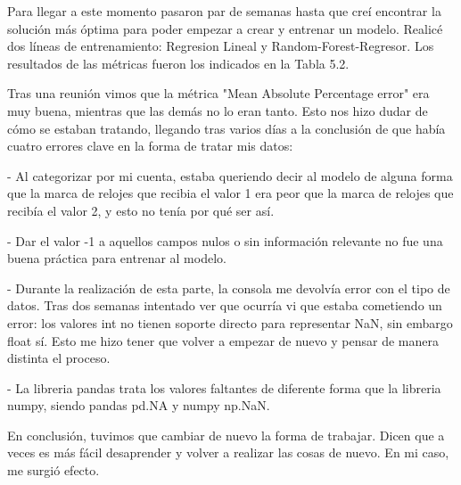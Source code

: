 	Para llegar a este momento pasaron par de semanas hasta que creí encontrar la solución más óptima para poder empezar a crear y entrenar un modelo. Realicé dos líneas de entrenamiento: Regresion Lineal y Random-Forest-Regresor. Los resultados de las métricas fueron los indicados en la Tabla 5.2.
	
	
	Tras una reunión vimos que la métrica "Mean Absolute Percentage error" era muy buena, mientras que las demás no lo eran tanto. Esto nos hizo dudar de cómo se estaban tratando, llegando tras varios días a la conclusión de que había cuatro errores clave en la forma de tratar mis datos:
	
	\begin{description}
		\item - Al categorizar por mi cuenta, estaba queriendo decir al modelo de alguna forma que la marca de relojes que recibia el valor 1 era peor que la marca de relojes que recibía el valor 2, y esto no tenía por qué ser así.
		\item - Dar el valor -1 a aquellos campos nulos o sin información relevante no fue una buena práctica para entrenar al modelo.
		\item - Durante la realización de esta parte, la consola me devolvía error con el tipo de datos. Tras dos semanas intentado ver que ocurría vi que estaba cometiendo un error: los valores int no tienen soporte directo para representar NaN, sin embargo float sí. Esto me hizo tener que volver a empezar de nuevo y pensar de manera distinta el proceso.
		\item - La libreria pandas trata los valores faltantes de diferente forma que la libreria numpy, siendo pandas pd.NA y numpy np.NaN.
	\end{description}
	
	En conclusión, tuvimos que cambiar de nuevo la forma de trabajar. Dicen que a veces es más fácil desaprender y volver a realizar las cosas de nuevo. En mi caso, me surgió efecto.
	
